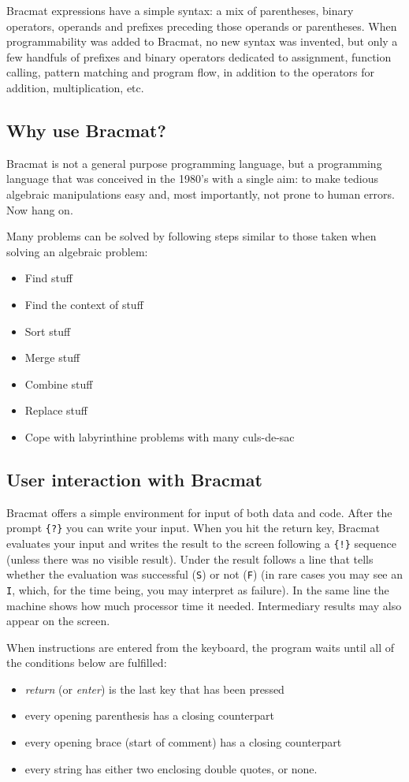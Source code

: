 \documentclass[12pt]{article}
\begin{document}
Bracmat expressions have a simple syntax: a mix of parentheses, binary
operators, operands and prefixes preceding those operands or
parentheses. When programmability was added to Bracmat, no new syntax
was invented, but only a few handfuls of prefixes and binary operators
dedicated to assignment, function calling, pattern matching and
program flow, in addition to the operators for addition,
multiplication, etc.

\subsection{Why use Bracmat?}

Bracmat is not a general purpose programming language, but a
programming language that was conceived in the 1980's with a single
aim: to make tedious algebraic manipulations easy and, most
importantly, not prone to human errors. Now hang on.

Many problems can be solved by following steps similar to those taken when solving an algebraic problem:
\begin{itemize}
\item Find stuff
\item Find the context of stuff
\item Sort stuff
\item Merge stuff
\item Combine stuff
\item Replace stuff
\item Cope with labyrinthine problems with many culs-de-sac
\end{itemize}

\subsection{User interaction with Bracmat}

Bracmat offers a simple environment for input of both data and
code. After the prompt \verb|{?}| you can write your input. When you
hit the return key, Bracmat evaluates your input and writes the result
to the screen following a \verb|{!}| sequence (unless there was no
visible result). Under the result follows a line that tells whether
the evaluation was successful (\verb|S|) or not (\verb|F|) (in rare
cases you may see an \verb|I|, which, for the time being, you may
interpret as failure). In the same line the machine shows how much
processor time it needed. Intermediary results may also appear on the
screen.

When instructions are entered from the keyboard, the program waits
until all of the conditions below are fulfilled:
\begin{itemize}
\item \emph{return} (or \emph{enter}) is the last key that has been pressed
\item every opening parenthesis has a closing counterpart
\item every opening brace (start of comment) has a closing counterpart
\item every string has either two enclosing double quotes, or none.
\end{itemize}
\end{document}
